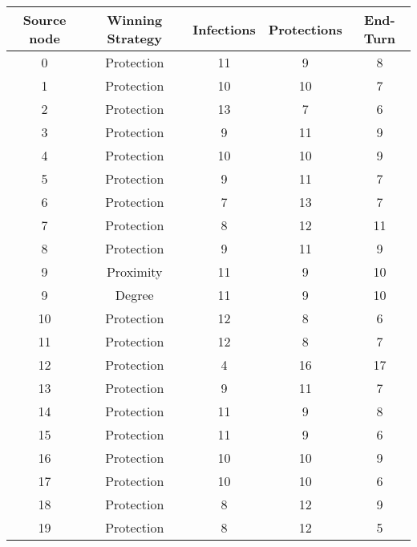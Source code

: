 \documentclass[results.tex]{subfiles}
\begin{document}
\begin{center}
  \begin{tabular}{| c || c | c | c | c |}
    \hline
    {\bfseries Source node} & {\bfseries Winning Strategy} & {\bfseries Infections} & {\bfseries Protections} & {\bfseries End-Turn} \\  %
    \hline\hline
    0 & Protection & 11 & 9 & 8 \\
    \hline
    1 & Protection & 10 & 10 & 7 \\
    \hline 
    2 & Protection & 13 & 7 & 6 \\
    \hline
    3 & Protection & 9 & 11 & 9 \\
    \hline
    4 & Protection & 10 & 10 & 9 \\
    \hline
    5 & Protection & 9 & 11 & 7 \\
    \hline
    6 & Protection & 7 & 13 & 7 \\
    \hline
    7 & Protection & 8 & 12 & 11 \\
    \hline
    8 & Protection & 9 & 11 & 9 \\
    \hline
    9 & Proximity & 11 & 9 & 10 \\
    \hline
    9 & Degree & 11 & 9 & 10 \\
    \hline
    10 & Protection & 12 & 8 & 6 \\
    \hline
    11 & Protection & 12 & 8 & 7 \\
    \hline
    12 & Protection & 4 & 16 & 17 \\
    \hline
    13 & Protection & 9 & 11 & 7 \\
    \hline
    14 & Protection & 11 & 9 & 8 \\
    \hline
    15 & Protection & 11 & 9 & 6 \\
    \hline
    16 & Protection & 10 & 10 & 9 \\
    \hline
    17 & Protection & 10 & 10 & 6 \\
    \hline
    18 & Protection & 8 & 12 & 9 \\
    \hline
    19 & Protection & 8 & 12 & 5 \\
    \hline
  \end{tabular}
\end{center}
\end{document}
